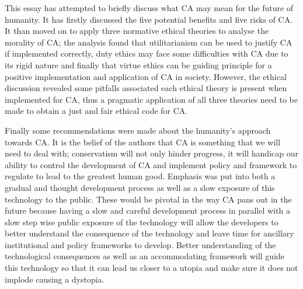 This essay has attempted to briefly discuss what CA may mean for the future of humanity. It has firstly discussed the five potential benefits and five risks of CA. It than moved on to apply three normative ethical theories to analyse the morality of CA; the analysis found that utilitarianism can be used to justify CA if implemented correctly, duty ethics may face some difficulties with CA due to its rigid nature and finally that virtue ethics can be guiding principle for a positive implementation and application of CA in society. However, the ethical discussion revealed some pitfalls associated each ethical theory is present when implemented for CA, thus a pragmatic application of all three theories need to be made to obtain a just and fair ethical code for CA.

Finally some recommendations were made about the humanity's approach towards CA. It is the belief of the authors that CA is something that we will need to deal with; conservatism will not only hinder progress, it will handicap our ability to control the development of CA and implement policy and framework to regulate to lead to the greatest human good. Emphasis was put into both a gradual and thought development process as well as a slow exposure of this technology to the public. These would be pivotal in the way CA pans out in the future because having a slow and careful development process in parallel with a slow step wise public exposure of the technology will allow the developers to better understand the consequence of the technology and leave time for ancillary institutional and policy frameworks to develop. Better understanding of the technological consequences as well as an accommodating framework will guide this technology so that it can lead us closer to a utopia and make sure it does not implode causing a dystopia.